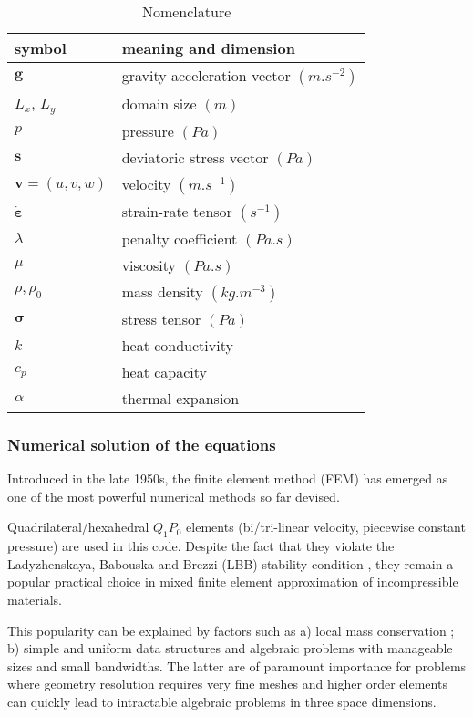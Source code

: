 \begin{table}
\centering
\begin{tabular}{ll}
\hline
symbol & meaning and dimension \\
\hline
\hline
${\bm g}$ & gravity acceleration vector $(m.s^{-2})$ \\
$L_x$, $L_y$ & domain size $(m)$ \\
$p$ & pressure $(Pa)$ \\
${\bm s}$ & deviatoric stress vector $(Pa)$ \\
${\bm v}=(u,v,w)$ & velocity $(m.s^{-1})$ \\
$\dot{\bm \varepsilon}$ & strain-rate tensor $(s^{-1})$ \\
$\lambda$ & penalty coefficient $(Pa.s)$ \\
$\mu$ & viscosity $(Pa.s)$ \\
$\rho,\rho_0$ & mass density $(kg.m^{-3})$ \\
${\bm \sigma}$ & stress tensor $(Pa)$ \\
$k$ & heat conductivity \\
$c_p$ & heat capacity\\
$\alpha$ & thermal expansion \\
\hline
\end{tabular}
\caption{Nomenclature \label{table_nomenc}}
\end{table}


\subsubsection{Numerical solution of the equations}

Introduced in the late 1950s, the finite element method (FEM) \cite{hugh,zita1,zita2,zita3} 
has emerged as one of the most powerful numerical methods so far devised. 

Quadrilateral/hexahedral $Q_1P_0$ elements (bi/tri-linear velocity, piecewise constant pressure) are used in this code.
Despite the fact that they violate the Ladyzhenskaya, Babouska and Brezzi (LBB) stability condition \cite{dohu03}, they remain a popular practical choice in mixed finite 
element approximation of incompressible materials. 

This popularity can be explained by factors such as a) local mass conservation ; b) simple and uniform data structures and algebraic problems 
with manageable sizes and small bandwidths. The latter are of paramount importance for problems 
where geometry resolution requires very fine meshes and higher order elements can quickly lead to intractable algebraic problems in three space dimensions.


